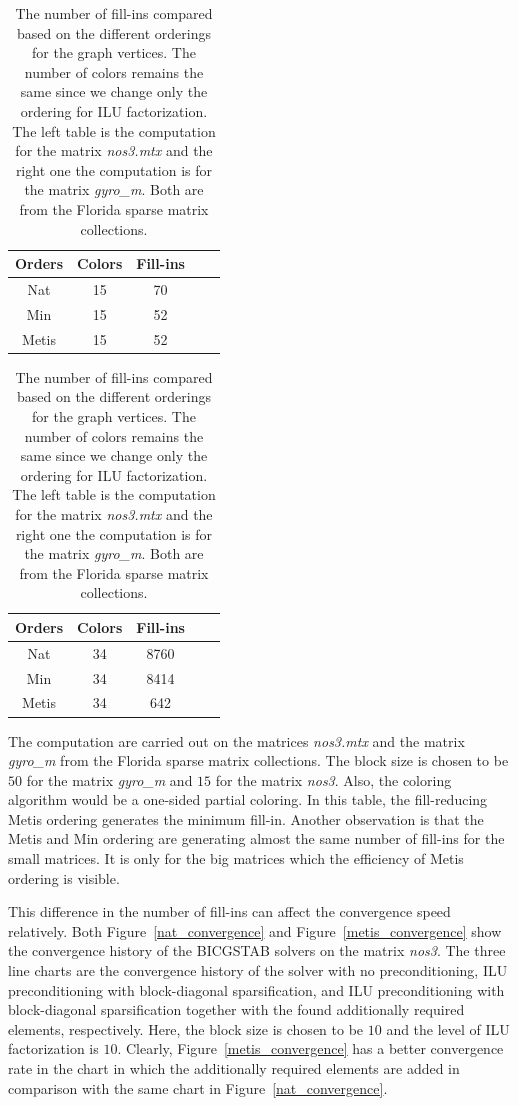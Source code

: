 \documentclass[12pt, twoside,a4paper,toc=bibliography]{scrbook}
\begin{document}
\begin{table}
\begin{tabular}{|c|c|c|c|c|}
\hline
Orders & Colors & Fill-ins\\\hline
Nat & 15 & 70\\\hline
Min & 15 & 52\\\hline
Metis & 15 & 52\\\hline
\end{tabular}
\hfill
\begin{tabular}{|c|c|c|c|c|}
\hline
Orders & Colors & Fill-ins \\\hline
Nat & 34 & 8760 \\\hline
Min & 34 & 8414 \\\hline
Metis & 34 & 642\\\hline
\end{tabular}
\caption{The number of fill-ins compared based on the different orderings
for the graph vertices. The number of colors remains the same since we change only the ordering for
ILU factorization.
The left table is the computation for the matrix \textit{nos3.mtx}
and the right one the computation is for the matrix \textit{gyro\_m}.
Both are from the Florida sparse matrix collections.}
\label{ilu-effect}
\end{table}

The computation are carried out on the matrices \textit{nos3.mtx}
and the matrix \textit{gyro\_m} from
the Florida sparse matrix collections. The block size is
chosen to be $50$ for the matrix \textit{gyro\_m} and $15$ for
the matrix \textit{nos3}. Also, the coloring algorithm would be a one-sided
partial coloring. In this table, the fill-reducing Metis ordering
generates the minimum fill-in.
Another observation is that the Metis and Min ordering are generating almost the same
number of fill-ins for the small matrices.
It is only for the big matrices which the efficiency of Metis ordering is visible.

This difference in the number of fill-ins can affect the convergence speed
relatively. Both Figure~\ref{nat_convergence}
and Figure~\ref{metis_convergence} show
the convergence history of the BICGSTAB solvers on the matrix \textit{nos3}.
The three line charts are the convergence history of the solver with
no preconditioning, ILU preconditioning with block-diagonal sparsification,
and ILU preconditioning with block-diagonal sparsification together with the found
additionally required elements, respectively.
Here, the block size is chosen to be $10$ and the level of ILU factorization
is $10$.
Clearly, Figure~\ref{metis_convergence} has a better convergence rate in the chart
in which the additionally required elements are added in comparison with the same
chart in Figure~\ref{nat_convergence}.
\end{document}
